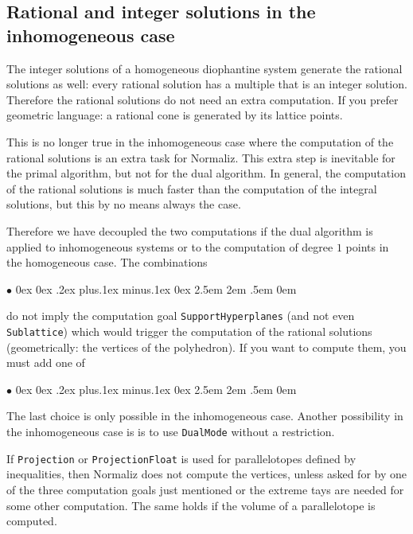 \documentclass[12pt,a4paper]{scrartcl}
\newcommand{\stdli}{ \topsep0ex \partopsep0ex %
\parsep.2ex plus.1ex minus.1ex \itemsep0ex%
\leftmargin2.5em \labelwidth2em \labelsep.5em \rightmargin0em}%
\renewenvironment{itemize}{\begin{list}{{$\bullet$}}{\stdli}}{\end{list}}
\theoremstyle{definition}
\def\itemtt[#1]{\item[\textbf{\ttt{#1}}]}
\def\ttt{\texttt}
\begin{document}
\subsection{Rational and integer solutions in the inhomogeneous case}\label{InhomDual}

The integer solutions of a homogeneous diophantine system generate the rational solutions as well: every rational solution has a multiple that is an integer solution. Therefore the rational solutions do not need an extra computation. If you prefer geometric language: a rational cone is generated by its lattice points.

This is no longer true in the inhomogeneous case where the computation of the rational solutions is an extra task for Normaliz. This extra step is inevitable for the primal algorithm, but not for the dual algorithm. In general, the computation of the rational solutions is much faster than the computation of the integral solutions, but this by no means always the case. 

Therefore we have decoupled the two computations if the dual algorithm is applied to inhomogeneous systems or to the computation of degree $1$ points in the homogeneous case. The combinations
\begin{itemize}
	\itemtt [DualMode HilbertBasis, -dN]
	
	\itemtt [DualMode Deg1Elements, -d1]
	
	\itemtt [DualMode ModuleGenerators]
	
	\itemtt [DualMode LatticePoints]
	
\end{itemize}
do not imply the computation goal \verb|SupportHyperplanes| (and not even \verb|Sublattice|) which would trigger the computation of the rational solutions (geometrically: the vertices of the polyhedron). If you want to compute them, you must add one of
\begin{itemize}
	\itemtt[SupportHyperplanes, -s]
	
	\itemtt[ExtremeRays]
	
	\itemtt[VerticesOfPolyhedron]
\end{itemize} 
The last choice is only possible in the inhomogeneous case. Another possibility in the inhomogeneous case is is to use \verb|DualMode| without a restriction.

If \verb|Projection| or \verb|ProjectionFloat| is used for parallelotopes defined by inequalities, then Normaliz does not compute the vertices, unless asked for by one of the three computation goals just mentioned or the extreme tays are needed for some other computation. The same holds if the volume of a parallelotope is computed.
\end{document}
